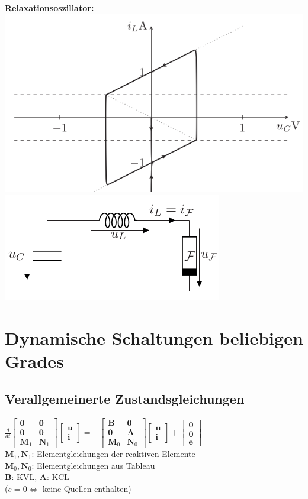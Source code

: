 \documentclass[fs, footer]{latex4ei}
\begin{document}
\begin{multicols*}{4}
\textbf{Relaxationsoszillator:}\\
\includegraphics[width=.5\linewidth]{img/relaxationsoszillator}
\includegraphics[width=.5\linewidth]{img/relaxationsoszillator-schaltung}
\section{Dynamische Schaltungen beliebigen Grades}
\subsection{Verallgemeinerte Zustandsgleichungen}
$\frac{d}{dt} \begin{bmatrix}\mathbf{0} & \mathbf{0}\\\mathbf{0} & \mathbf{0}\\\mathbf{M}_1 & \mathbf{N}_1\end{bmatrix}\begin{bmatrix}\mathbf{u}\\\mathbf{i}\end{bmatrix} = - \begin{bmatrix} \mathbf{B} & \mathbf{0} \\ \mathbf{0} & \mathbf{A} \\ \mathbf{M}_0 & \mathbf{N}_0\end{bmatrix}\begin{bmatrix}\mathbf{u}\\\mathbf{i}\end{bmatrix} + \begin{bmatrix}\mathbf{0}\\\mathbf{0}\\\mathbf{e}\end{bmatrix}$\\
$\mathbf{M}_1, \mathbf{N}_1$: Elementgleichungen der reaktiven Elemente\\
$\mathbf{M}_0, \mathbf{N}_0$: Elementgleichungen aus Tableau\\
$\mathbf{B}$: KVL, $\mathbf{A}$: KCL\\
($e = 0 \Leftrightarrow$ keine Quellen enthalten)

\end{multicols*}
\end{document}
